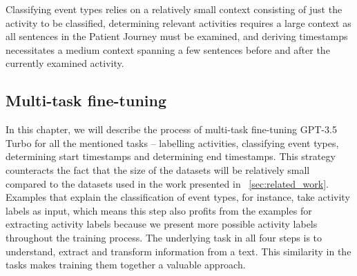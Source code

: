 Classifying event types relies on a relatively small context consisting of just the activity to be classified, determining relevant activities requires a large context as all sentences in the Patient Journey must be examined, and deriving timestamps necessitates a medium context spanning a few sentences before and after the currently examined activity.


\subsection{Multi-task fine-tuning}\label{sec:multi-task-ft}
In this chapter, we will describe the process of multi-task fine-tuning GPT-3.5 Turbo for all the mentioned tasks – labelling activities, classifying event types,  determining start timestamps and determining end timestamps. This strategy counteracts the fact that the size of the datasets will be relatively small compared to the datasets used in the work presented in ~\autoref{sec:related_work}. Examples that explain the classification of event types, for instance, take activity labels as input, which means this step also profits from the examples for extracting activity labels because we present more possible activity labels throughout the training process. The underlying task in all four steps is to understand, extract and transform information from a text. This similarity in the tasks makes training them together a valuable approach.

